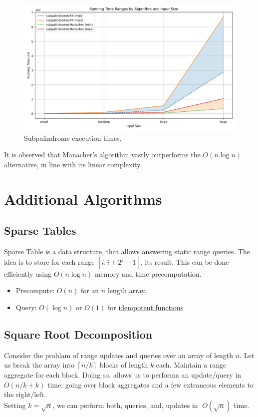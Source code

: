 \documentclass[12pt]{article}
\begin{document}
\begin{figure}[H]
  \centering
  \includegraphics[width=0.7\linewidth]{palindrome-stats.png}
  \caption{Subpalindrome execution times.}
\end{figure}

It is observed that Manacher's algorithm vastly outperforms the $O(n\log n)$ alternative, in line with its linear complexity.

\section{Additional Algorithms}\label{sec:additional-algorithms-detail}

\subsection{Sparse Tables\cite{sparse_table_cp}}
Sparse Table is a data structure, that allows answering static range queries.  
The idea is to store for each range $[i:i + 2^j - 1]$, its result. This can be done efficiently using $O(n\log n)$ memory and time precomputation.  
\begin{itemize}
  \item Precompute: $O(n)$ for an $n$ length array.
  \item Query: $O(\log n)$ or $O(1)$ for \hyperref[https://en.wikipedia.org/wiki/Idempotence]{idempotent functions}
\end{itemize}

\subsection{Square Root Decomposition\cite{sqrt_decomposition_cp}}
Consider the problam of range updates and queries over an array of length $n$.  
Let us break the array into $\left\lceil n/k \right\rceil$ blocks of length $k$ each.\cite{cs166_0}
Maintain a range aggregate for each block.  
Doing so, allows us to performa an update/query in $O(n/k + k)$ time, going over block aggregates and a few extraneous elements to the right/left.   \\
Setting $k = \sqrt n$, we can perform both, queries, and, updates in $\;O(\sqrt n)$ time.
\end{document}
